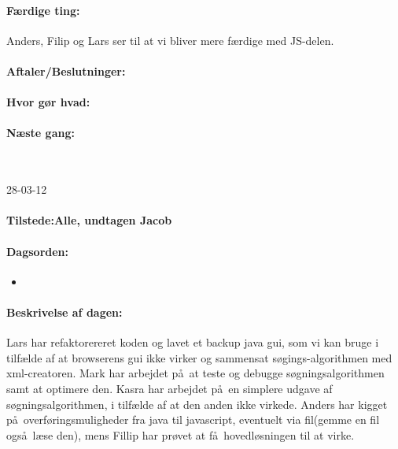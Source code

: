 \documentclass[a4paper,10pt,titlepage]{article}
\begin{document}
		\paragraph{F\ae rdige ting:}
		Anders, Filip og Lars ser til at vi bliver mere f\ae rdige med JS-delen.
		\paragraph{Aftaler/Beslutninger:}
		
		\paragraph{Hvor g\o r hvad:}
		
		\paragraph{N\ae ste gang:}\mbox{}\\
		
		\begin{center}
		28-03-12
		\end{center}
		
		\paragraph{Tilstede:Alle, undtagen Jacob}
		\paragraph{Dagsorden:}
		\begin{itemize}
					\item 
					
		\end{itemize}
		
		\paragraph{Beskrivelse af dagen:}
		Lars har refaktorereret koden og lavet et backup java gui, som vi kan bruge i tilf\ae lde af at browserens gui ikke virker og sammensat s\o gings-algorithmen med xml-creatoren.
Mark har arbejdet p\aa \ at teste og debugge s\o gningsalgorithmen samt at optimere den. Kasra har arbejdet p\aa \ en simplere udgave af s\o gningsalgorithmen, i tilf\ae lde af at den anden ikke virkede.
Anders har kigget p\aa \ overf\o ringsmuligheder fra java til javascript, eventuelt via fil(gemme en fil ogs\aa \ l\ae se den), mens Fillip har pr\o vet at f\aa \ hovedl\o sningen til at virke.
\end{document}
